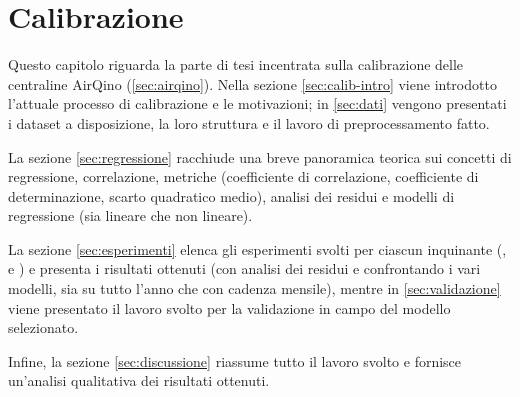 \chapter{Calibrazione}\label{ch:calibrazione}
Questo capitolo riguarda la parte di tesi incentrata sulla calibrazione delle centraline AirQino (\ref{sec:airqino}). Nella sezione \ref{sec:calib-intro} viene introdotto l'attuale processo di calibrazione e le motivazioni; in \ref{sec:dati} vengono presentati i dataset a disposizione, la loro struttura e il lavoro di preprocessamento fatto.

La sezione \ref{sec:regressione} racchiude una breve panoramica teorica sui concetti di regressione, correlazione, metriche (coefficiente di correlazione, coefficiente di determinazione, scarto quadratico medio), analisi dei residui e modelli di regressione (sia lineare che non lineare).

La sezione \ref{sec:esperimenti} elenca gli esperimenti svolti per ciascun inquinante (,  e ) e presenta i risultati ottenuti (con analisi dei residui e confrontando i vari modelli, sia su tutto l'anno che con cadenza mensile), mentre in \ref{sec:validazione} viene presentato il lavoro svolto per la validazione in campo del modello selezionato.

Infine, la sezione \ref{sec:discussione} riassume tutto il lavoro svolto e fornisce un'analisi qualitativa dei risultati ottenuti.

\clearpage
